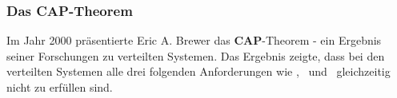 \subsubsection{Das CAP-Theorem}\label{cap}

Im Jahr 2000 präsentierte Eric A. Brewer das \textbf{CAP}-Theorem - ein Ergebnis seiner Forschungen zu verteilten Systemen. Das Ergebnis zeigte, dass bei den verteilten Systemen alle drei folgenden Anforderungen wie \Cap, \cAp\ und \caP\ gleichzeitig nicht zu erfüllen sind.
